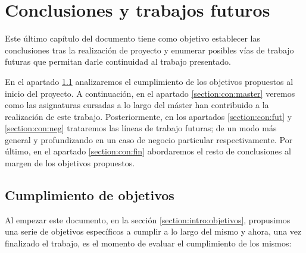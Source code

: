 \chapter{Conclusiones y trabajos futuros}
\label{chapter:conclusiones}

Este último capítulo del documento tiene como objetivo establecer las conclusiones tras la realización de proyecto y enumerar posibles vías de trabajo futuras que permitan darle continuidad al trabajo presentado.

En el apartado \ref{section:con:obj} analizaremos el cumplimiento de los objetivos propuestos al inicio del proyecto. A continuación, en el apartado \ref{section:con:master} veremos como las asignaturas cursadas  a lo largo del máster han contribuido a la realización de este trabajo.  Posteriormente, en los apartados \ref{section:con:fut} y \ref{section:con:neg} trataremos las líneas de trabajo futuras; de un modo más general y profundizando en un caso de negocio particular respectivamente. Por último, en el apartado \ref{section:con:fin} abordaremos el resto de conclusiones al margen de los objetivos propuestos. 




\section{Cumplimiento de objetivos}
\label{section:con:obj}

Al empezar este documento, en la sección \ref{section:intro:objetivos}, propusimos una serie de objetivos específicos a cumplir a lo largo del mismo y ahora, una vez finalizado el trabajo, es el momento de evaluar el cumplimiento de los mismos: 

